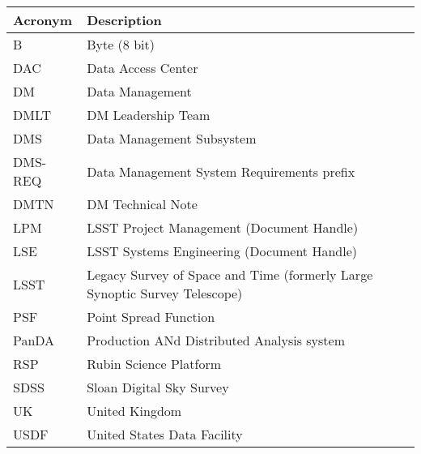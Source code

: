 \addtocounter{table}{-1}
\begin{longtable}{p{}p{}}\hline
\textbf{Acronym} & \textbf{Description}  \\\hline

B & Byte (8 bit) \\\hline
DAC & Data Access Center \\\hline
DM & Data Management \\\hline
DMLT & DM Leadership Team \\\hline
DMS & Data Management Subsystem \\\hline
DMS-REQ & Data Management System Requirements prefix \\\hline
DMTN & DM Technical Note \\\hline
LPM & LSST Project Management (Document Handle) \\\hline
LSE & LSST Systems Engineering (Document Handle) \\\hline
LSST & Legacy Survey of Space and Time (formerly Large Synoptic Survey Telescope) \\\hline
PSF & Point Spread Function \\\hline
PanDA &  Production ANd Distributed Analysis system \\\hline
RSP & Rubin Science Platform \\\hline
SDSS & Sloan Digital Sky Survey \\\hline
UK & United Kingdom \\\hline
USDF & United States Data Facility \\\hline
\end{longtable}
